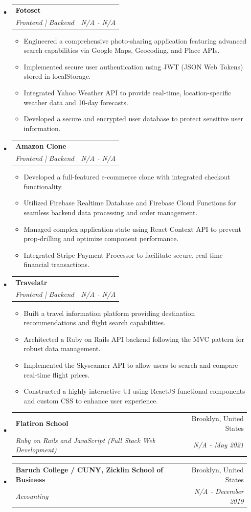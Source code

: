 \documentclass[letterpaper,11pt]{article}
\makeatletter
\newlength{\outerbordwidth}
\newcommand{\resitem}[1]{\item #1 \vspace{-2pt}}
\newcommand{\resheading}[1]{\vspace{6pt}
    \parbox{\textwidth}{\setlength{\FrameSep}{\outerbordwidth}
        \begin{shaded}
    \setlength{\fboxsep}{0pt}\framebox[\textwidth][l]{\setlength{\fboxsep}{2pt}\fcolorbox{shadecolorB}{shadecolorB}{\textbf{\sffamily{\mbox{~}\makebox[6.8in][l]{\large #1} \vphantom{p\^{E}}}}}}
        \end{shaded}
    }\vspace{-6pt}
    }
\newcommand{\ressubheading}[4]{
    \begin{tabular*}{6.5in}{p{4.8in}@{\extracolsep{\fill}}r}
            \textbf{#1} & #2 \\
            \textit{#3} & \textit{#4} \\
    \end{tabular*}\vspace{-8pt}}
\makeatother
\begin{document}
      \begin{itemize}
        \item \ressubheading{Fotoset}{}{Frontend | Backend}{N/A - N/A}
        \begin{itemize}
            \resitem{Engineered a comprehensive photo-sharing application featuring advanced search capabilities via Google Maps, Geocoding, and Place APIs.}
            \resitem{Implemented secure user authentication using JWT (JSON Web Tokens) stored in localStorage.}
            \resitem{Integrated Yahoo Weather API to provide real-time, location-specific weather data and 10-day forecasts.}
            \resitem{Developed a secure and encrypted user database to protect sensitive user information.}
        \end{itemize}
        \item \ressubheading{Amazon Clone}{}{Frontend | Backend}{N/A - N/A}
        \begin{itemize}
            \resitem{Developed a full-featured e-commerce clone with integrated checkout functionality.}
            \resitem{Utilized Firebase Realtime Database and Firebase Cloud Functions for seamless backend data processing and order management.}
            \resitem{Managed complex application state using React Context API to prevent prop-drilling and optimize component performance.}
            \resitem{Integrated Stripe Payment Processor to facilitate secure, real-time financial transactions.}
        \end{itemize}
        \item \ressubheading{Travelatr}{}{Frontend | Backend}{N/A - N/A}
        \begin{itemize}
            \resitem{Built a travel information platform providing destination recommendations and flight search capabilities.}
            \resitem{Architected a Ruby on Rails API backend following the MVC pattern for robust data management.}
            \resitem{Implemented the Skyscanner API to allow users to search and compare real-time flight prices.}
            \resitem{Constructed a highly interactive UI using ReactJS functional components and custom CSS to enhance user experience.}
        \end{itemize}
      \end{itemize}
	    \resheading{Education}
	    \begin{itemize}
		    \item \ressubheading{Flatiron School}{Brooklyn, United States}{Ruby on Rails and JavaScript (Full Stack Web Development)}{N/A - May 2021}
		    \item \ressubheading{Baruch College / CUNY, Zicklin School of Business}{Brooklyn, United States}{Accounting}{N/A - December 2019}
      \end{itemize}
\end{document}
